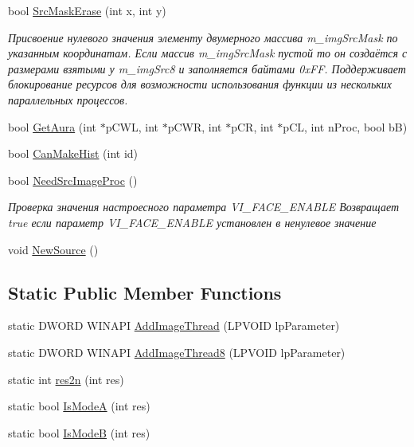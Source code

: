 \begin{DoxyCompactItemize}
bool \hyperlink{class_c_v_i_engine_base_aa12afe22df5c306e03eb855d4fed4fce}{Src\+Mask\+Erase} (int x, int y)
\begin{DoxyCompactList}\small\item\em Присвоение нулевого значения элементу двумерного массива m\+\_\+img\+Src\+Mask по указанным координатам. Если массив m\+\_\+img\+Src\+Mask пустой то он создаётся с размерами взятыми у m\+\_\+img\+Src8 и заполняется байтами 0x\+F\+F. Поддерживает блокирование ресурсов для возможности использования функции из нескольких параллельных процессов. \end{DoxyCompactList}\item 
bool \hyperlink{class_c_v_i_engine_base_aaa7d51c8145d1094997fc485508dd402}{Get\+Aura} (int $\ast$p\+C\+W\+L, int $\ast$p\+C\+W\+R, int $\ast$p\+C\+R, int $\ast$p\+C\+L, int n\+Proc, bool b\+B)
\item 
bool \hyperlink{class_c_v_i_engine_base_a33937f3f067ec0fa9829c7a40b54be50}{Can\+Make\+Hist} (int id)
\item 
bool \hyperlink{class_c_v_i_engine_base_a1d144bb4fec300b83067404ffdc9ae6f}{Need\+Src\+Image\+Proc} ()
\begin{DoxyCompactList}\small\item\em Проверка значения настроесного параметра V\+I\+\_\+\+F\+A\+C\+E\+\_\+\+E\+N\+A\+B\+L\+E Возвращает true если параметр V\+I\+\_\+\+F\+A\+C\+E\+\_\+\+E\+N\+A\+B\+L\+E установлен в ненулевое значение \end{DoxyCompactList}\item 
void \hyperlink{class_c_v_i_engine_base_afcadee160287c12571501a09c222bea3}{New\+Source} ()
\end{DoxyCompactItemize}
\subsection*{Static Public Member Functions}
\begin{DoxyCompactItemize}
\item 
static D\+W\+O\+R\+D W\+I\+N\+A\+P\+I \hyperlink{class_c_v_i_engine_base_ad9c65ff1caec8b5042fd55628c515373}{Add\+Image\+Thread} (L\+P\+V\+O\+I\+D lp\+Parameter)
\item 
static D\+W\+O\+R\+D W\+I\+N\+A\+P\+I \hyperlink{class_c_v_i_engine_base_acb273d8d1df0ad615bec58b0a9c5f1cc}{Add\+Image\+Thread8} (L\+P\+V\+O\+I\+D lp\+Parameter)
\item 
static int \hyperlink{class_c_v_i_engine_base_a96058275b74d792351596a389ee29bbd}{res2n} (int res)
\item 
static bool \hyperlink{class_c_v_i_engine_base_a2f8fba45abd4bb564101fb090de26a48}{Is\+Mode\+A} (int res)
\item 
static bool \hyperlink{class_c_v_i_engine_base_a7029194ddd71a7322746e962a3ed5b46}{Is\+Mode\+B} (int res)
\end{DoxyCompactItemize}
